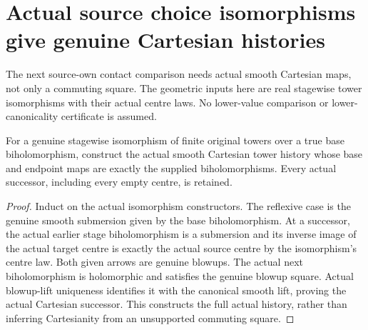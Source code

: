 \section{Actual source choice isomorphisms give genuine Cartesian histories}

The next source-own contact comparison needs actual smooth Cartesian maps,
not only a commuting square. The geometric inputs here are real stagewise
tower isomorphisms with their actual centre laws. No lower-value comparison
or lower-canonicality certificate is assumed.

\begin{theorem}
\label{hir:original-source-isomorphism-actual-cartesian-tower}
\leanok
For a genuine stagewise isomorphism of finite original towers over a true
base biholomorphism, construct the actual smooth Cartesian tower history
whose base and endpoint maps are exactly the supplied biholomorphisms.
Every actual successor, including every empty centre, is retained.
\end{theorem}
\begin{proof}
Induct on the actual isomorphism constructors. The reflexive case is the
genuine smooth submersion given by the base biholomorphism. At a successor,
the actual earlier stage biholomorphism is a submersion and its inverse
image of the actual target centre is exactly the actual source centre by
the isomorphism's centre law. Both given arrows are genuine blowups.
The actual next biholomorphism is holomorphic and satisfies the genuine
blowup square. Actual blowup-lift uniqueness identifies it with the
canonical smooth lift, proving the actual Cartesian successor. This
constructs the full actual history, rather than inferring Cartesianity
from an unsupported commuting square.
\end{proof}

